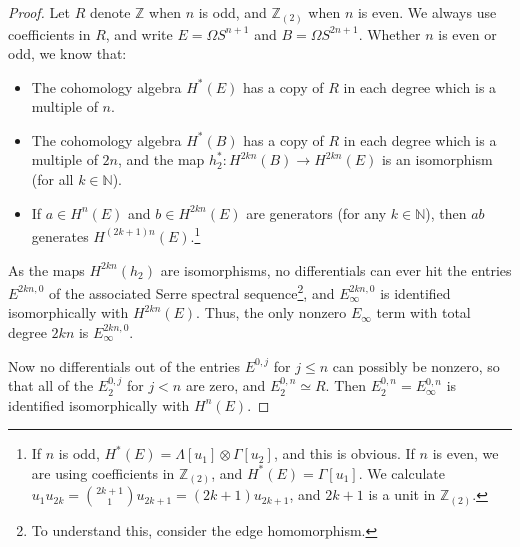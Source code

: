 \documentclass{article}
\newcommand{\N}{\mathbb{N}}
\newcommand{\Z}{\mathbb{Z}}
\renewcommand{\to}{\longrightarrow}
\theoremstyle{definition}
\begin{document}
\begin{proof}
Let $R$ denote $\Z$ when $n$ is odd, and $\Z_{(2)}$ when $n$ is even. We always use coefficients in $R$, and write $E=\Omega S^{n+1}$ and $B=\Omega S^{2n+1}$. Whether $n$ is even or odd, we know that:
\begin{itemize}
\item The cohomology algebra $H^*(E)$ has a copy of $R$ in each degree which is a multiple of $n$.
\item The cohomology algebra $H^*(B)$ has a copy of $R$ in each degree which is a multiple of $2n$, and the map $h_2^*:H^{2kn}(B)\to H^{2kn}(E)$ is an isomorphism (for all $k\in\N$).
\item If $a\in H^{n}(E)$ and $b\in H^{2kn}(E)$ are generators (for any $k\in\N$), then $ab$ generates $H^{(2k+1)n}(E)$.\footnote{If $n$ is odd, $H^*(E)=\Lambda[u_1]\otimes \Gamma[u_2]$, and this is obvious. If $n$ is even, we are using coefficients in $\Z_{(2)}$, and $H^*(E)=\Gamma[u_1]$. We calculate $u_1u_{2k}=\binom{2k+1}{1}u_{2k+1}=(2k+1)u_{2k+1}$, and $2k+1$ is a unit in $\Z_{(2)}$.}
\end{itemize}

As the maps $H^{2kn}(h_2)$ are isomorphisms, no differentials can ever hit the entries $E^{2kn,0}$ of the associated Serre spectral sequence\footnote{To understand this, consider the edge homomorphism.}, and $E^{2kn,0}_\infty$ is identified isomorphically with $H^{2kn}(E)$.
Thus, the only nonzero $E_\infty$ term with total degree $2kn$ is $E_\infty^{2kn,0}$.

Now no differentials out of the entries $E^{0,j}$ for $j\leq n$ can possibly be nonzero, so that all of the $E_2^{0,j}$ for $j<n$ are zero, and $E_2^{0,n}\simeq R$. Then $E_2^{0,n}=E_\infty^{0,n}$ is identified isomorphically with $H^n(E)$.


\end{proof}
\end{document}
